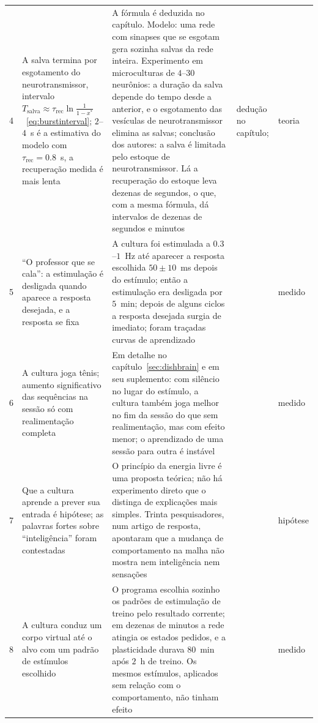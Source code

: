 {\begin{longtable}{>{\raggedright}p{0.5cm}>{\raggedright}p{4.0cm}>{\raggedright}p{5.6cm}>{\raggedright}p{2.3cm}>{\raggedright\arraybackslash}p{1.7cm}}
4 & A salva termina por esgotamento do neurotransmissor, intervalo $T_{\text{salva}}\approx\tau_{\text{rec}}\ln\frac{1}{1-x^*}$~\eqref{eq:burstinterval}; $2$--$4$~s é a estimativa do modelo com $\tau_{\text{rec}}=0.8$~s, a recuperação medida é mais lenta & A fórmula é deduzida no capítulo. Modelo: uma rede com sinapses que se esgotam gera sozinha salvas da rede inteira. Experimento em microculturas de $4$--$30$ neurônios: a duração da salva depende do tempo desde a anterior, e o esgotamento das vesículas de neurotransmissor elimina as salvas; conclusão dos autores: a salva é limitada pelo estoque de neurotransmissor. Lá a recuperação do estoque leva dezenas de segundos, o que, com a mesma fórmula, dá intervalos de dezenas de segundos e minutos & dedução no capítulo; \cite{Tsodyks2000,CohenSegal2011,Tsodyks1997} & teoria \\
5 & ``O professor que se cala'': a estimulação é desligada quando aparece a resposta desejada, e a resposta se fixa & A cultura foi estimulada a $0.3$--$1$~Hz até aparecer a resposta escolhida $50\pm10$~ms depois do estímulo; então a estimulação era desligada por $5$~min; depois de alguns ciclos a resposta desejada surgia de imediato; foram traçadas curvas de aprendizado & \cite{Shahaf2001} & medido \\
6 & A cultura joga tênis; aumento significativo das sequências na sessão só com realimentação completa & Em detalhe no capítulo~\ref{sec:dishbrain} e em seu suplemento: com silêncio no lugar do estímulo, a cultura também joga melhor no fim da sessão do que sem realimentação, mas com efeito menor; o aprendizado de uma sessão para outra é instável & \cite{Kagan2022} & medido \\
7 & Que a cultura aprende a prever sua entrada é hipótese; as palavras fortes sobre ``inteligência'' foram contestadas & O princípio da energia livre é uma proposta teórica; não há experimento direto que o distinga de explicações mais simples. Trinta pesquisadores, num artigo de resposta, apontaram que a mudança de comportamento na malha não mostra nem inteligência nem sensações & \cite{Friston2010,Balci2023} & hipótese \\
8 & A cultura conduz um corpo virtual até o alvo com um padrão de estímulos escolhido & O programa escolhia sozinho os padrões de estimulação de treino pelo resultado corrente; em dezenas de minutos a rede atingia os estados pedidos, e a plasticidade durava $80$~min após $2$~h de treino. Os mesmos estímulos, aplicados sem relação com o comportamento, não tinham efeito & \cite{Bakkum2008} & medido \\

\end{longtable}}
